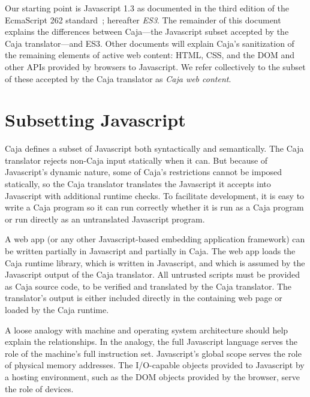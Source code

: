 \documentclass[letterpaper,twocolumn,10pt]{article}
\begin{document}
Our starting point is Javascript 1.3 as documented in the third edition of 
the EcmaScript 262 standard~\cite{ECMA-262}; hereafter \emph{ES3}. The 
remainder of this document explains the differences between Caja---the 
Javascript subset accepted by the Caja translator---and ES3. Other documents 
will explain Caja's sanitization of the remaining elements of active web 
content: HTML, CSS, and the DOM and other APIs provided by browsers to 
Javascript. We refer collectively to the subset of these accepted by the 
Caja translator as \emph{Caja web content}.


\section{Subsetting Javascript}

Caja defines a subset of Javascript both syntactically and semantically. The 
Caja translator rejects non-Caja input statically when it can. But because 
of Javascript's dynamic nature, some of Caja's restrictions cannot be 
imposed statically, so the Caja translator translates the Javascript it 
accepts into Javascript with additional runtime checks. To facilitate 
development, it is easy to write a Caja program so it can run correctly 
whether it is run as a Caja program or run directly as an untranslated 
Javascript program.

A web app (or any other Javascript-based embedding application framework) can 
be written partially in Javascript and partially in Caja. The web app loads 
the Caja runtime library, which is written in Javascript, and which is 
assumed by the Javascript output of the Caja translator. All untrusted 
scripts must be provided as Caja source code, to be verified and translated 
by the Caja translator. The translator's output is either included directly 
in the containing web page or loaded by the Caja runtime.

A loose analogy with machine and operating system architecture should help 
explain the relationships. In the analogy, the full Javascript language 
serves the role of the machine's full instruction set. Javascript's global 
scope serves the role of physical memory addresses. The I/O-capable objects 
provided to Javascript by a hosting environment, such as the DOM objects 
provided by the browser, serve the role of devices.
\end{document}
